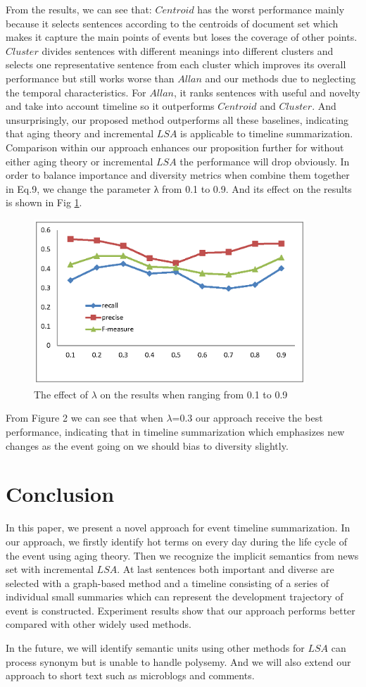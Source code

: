 \documentclass[runningheads,a4paper]{llncs}
\begin{document}
From the results, we can see that: $Centroid$ has the worst performance mainly because it selects sentences according to the centroids of document set which makes it capture the main points of events but loses the coverage of other points. $Cluster$ divides sentences with different meanings into different clusters and selects one representative sentence from each cluster which improves its overall performance but still works worse than $Allan$ and our methods due to neglecting the temporal characteristics. For $Allan$, it ranks sentences with useful and novelty and take into account timeline so it outperforms $Centroid$ and $Cluster$. And unsurprisingly, our proposed method outperforms all these baselines, indicating that aging theory and incremental $LSA$ is applicable to timeline summarization. Comparison within our approach enhances our proposition further for without either aging theory or incremental $LSA$ the performance will drop obviously.
In order to balance importance and diversity metrics when combine them together in Eq.9, we change the parameter λ from 0.1 to 0.9. And its effect on the results is shown in Fig \ref{fig:lambda}.

\begin{figure}
\centering
\includegraphics[height=6.2cm]{lambda}
\caption{The effect of $\lambda$ on the results when ranging from 0.1 to 0.9}
\label{fig:lambda}
\end{figure}

From Figure 2 we can see that when $\lambda$=0.3 our approach receive the best performance, indicating that in timeline summarization which emphasizes new changes as the event going on we should bias to diversity slightly.

\section{Conclusion}
In this paper, we present a novel approach for event timeline summarization. In our approach, we firstly identify hot terms on every day during the life cycle of the event using aging theory. Then we recognize the implicit semantics from news set with incremental $LSA$. At last sentences both important and diverse are selected with a graph-based method and a timeline consisting of a series of individual small summaries which can represent the development trajectory of event is constructed. Experiment results show that our approach performs better compared with other widely used methods.

In the future, we will identify semantic units using other methods for $LSA$ can process synonym but is unable to handle polysemy. And we will also extend our approach to short text such as microblogs and comments.



\end{document}
